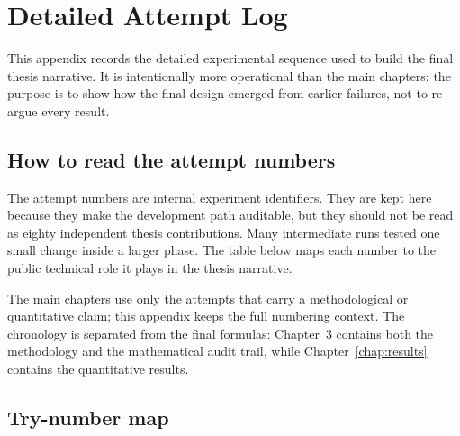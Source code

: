 \chapter{Detailed Attempt Log}
\label{app:detailed_attempt_log}
\begingroup
\small
\setlength{\parskip}{3pt plus 1pt minus 1pt}
\setlength{\floatsep}{6pt plus 2pt minus 2pt}
\setlength{\textfloatsep}{6pt plus 2pt minus 2pt}
\setlength{\intextsep}{6pt plus 2pt minus 2pt}
\setlength{\abovecaptionskip}{2pt}
\setlength{\belowcaptionskip}{0pt}

This appendix records the detailed experimental sequence used to build the
final thesis narrative. It is intentionally more operational than the main
chapters: the purpose is to show how the final design emerged from earlier
failures, not to re-argue every result.

\section{How to read the attempt numbers}

The attempt numbers are internal experiment identifiers. They are kept here
because they make the development path auditable, but they should not be read
as eighty independent thesis contributions. Many intermediate runs tested one
small change inside a larger phase. The table below maps each number to the
public technical role it plays in the thesis narrative.

The main chapters use only the attempts that carry a methodological or
quantitative claim; this appendix keeps the full numbering context. The
chronology is separated from the final formulas: Chapter~3 contains both the
methodology and the mathematical audit trail, while
Chapter~\ref{chap:results} contains the quantitative results.

\section{Try-number map}


